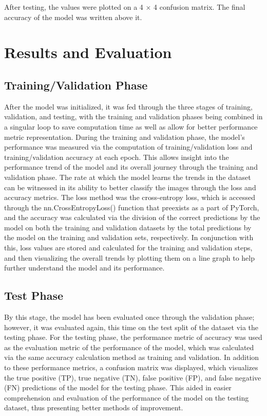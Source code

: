 \documentclass[11pt]{article}
\begin{document}
After testing, the values were plotted on a 4 $\times$ 4 confusion matrix. The final accuracy of the model was written above it.


\section{Results and Evaluation}

\subsection{Training/Validation Phase}
After the model was initialized, it was fed through the three stages of training, validation, and testing, with the training and validation phases being combined in a singular loop to save computation time as well as allow for better performance metric representation. During the training and validation phase, the model's performance was measured via the computation of training/validation loss and training/validation accuracy at each epoch. This allows insight into the performance trend of the model and its overall journey through the training and validation phase. The rate at which the model learns the trends in the dataset can be witnessed in its ability to better classify the images through the loss and accuracy metrics. The loss method was the cross-entropy loss, which is accessed through the nn.CrossEntropyLoss() function that preexists as a part of PyTorch, and the accuracy was calculated via the division of the correct predictions by the model on both the training and validation datasets by the total predictions by the model on the training and validation sets, respectively. In conjunction with this, loss values are stored and calculated for the training and validation steps, and then visualizing the overall trends by plotting them on a line graph to help further understand the model and its performance.

\subsection{Test Phase}
By this stage, the model has been evaluated once through the validation phase; however, it was evaluated again, this time on the test split of the dataset via the testing phase. For the testing phase, the performance metric of accuracy was used as the evaluation metric of the performance of the model, which was calculated via the same accuracy calculation method as training and validation. In addition to these performance metrics, a confusion matrix was displayed, which visualizes the true positive (TP), true negative (TN), false positive (FP), and false negative (FN) predictions of the model for the testing phase. This aided in easier comprehension and evaluation of the performance of the model on the testing dataset, thus presenting better methods of improvement.
\end{document}

